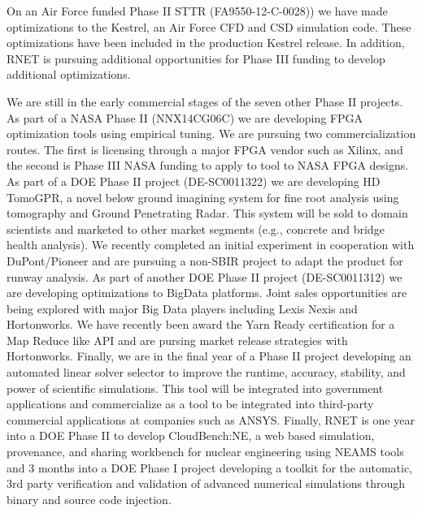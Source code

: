 On an Air Force funded Phase II STTR (FA9550-12-C-0028)) we
have made optimizations to the Kestrel, an Air Force CFD and CSD
simulation code. These optimizations have been included in the
production Kestrel release. In addition, RNET is pursuing additional
opportunities for Phase III funding to develop additional
optimizations.


We are still in the early commercial stages of the seven other Phase II
projects. As part of a NASA Phase II (NNX14CG06C) we are developing
FPGA optimization tools using empirical tuning. We are pursuing two
commercialization routes. The first is licensing through a major FPGA
vendor such as Xilinx, and the second is Phase III NASA funding to
apply to tool to NASA FPGA designs. As part of a DOE Phase II project
(DE-SC0011322) we are developing HD TomoGPR, a novel below ground
imagining system for fine root analysis using tomography and Ground
Penetrating Radar. This system will be sold to domain scientists and
marketed to other market segments (e.g., concrete and bridge health
analysis). We recently completed an initial experiment in cooperation
with DuPont/Pioneer and are pursuing a non-SBIR project to adapt the
product for runway analysis. As part of another DOE Phase II project
(DE-SC0011312) we are developing optimizations to BigData
platforms. Joint sales opportunities are being explored with major Big
Data players including Lexis Nexis and Hortonworks. We have recently
been award the Yarn Ready certification for a Map Reduce like API and
are pursing market release strategies with Hortonworks. Finally, we
are in the final year of a Phase II project developing an automated linear
solver selector to improve the runtime, accuracy, stability, and power
of scientific simulations. This tool will be integrated into
government applications and commercialize as a tool to be integrated
into third-party commercial applications at companies such as ANSYS. Finally, 
RNET is one year into a DOE Phase II to develop CloudBench:NE, a web based simulation, provenance, 
and sharing workbench for nuclear engineering using NEAMS tools and 3 months into a DOE Phase I 
project developing a toolkit for the automatic, 3rd party verification and validation of 
advanced numerical simulations through binary and source code injection. 

